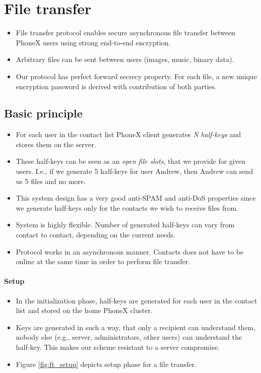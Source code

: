 \documentclass[a4paper,10pt]{article}
\begin{document}
\section{File transfer}
\begin{itemize}
 \item File transfer protocol enables secure asynchronous file transfer between PhoneX users using strong end-to-end encryption.
 \item Arbitrary files can be sent between users (images, music, binary data).
 \item Our protocol has perfect forward secrecy property. For each file, a new unique encryption 
password is derived with contribution of both parties.
\end{itemize}

\subsection{Basic principle}
\begin{itemize}
 \item For each user in the contact list PhoneX client generates \emph{N} \emph{half-keys} and stores them on the server.
 \item These half-keys can be seen as an \emph{open file slots}, that we provide for given users. I.e., 
if we generate 5 half-keys for user Andrew, then Andrew can send us 5 files and no more. %
 \item This system design has a very good anti-SPAM and anti-DoS properties since we generate half-keys only for the contacts we wish to receive files from.
 \item System is highly flexible. Number of generated half-keys can vary from contact to contact, depending on the current needs.
 \item Protocol works in an asynchronous manner. Contacts does not have to be online at the same time in order to perform file transfer.
\end{itemize}

\paragraph{Setup}
\begin{itemize}
 \item In the initialization phase, half-keys are generated for each user in the contact list and stored on the home PhoneX cluster.
 \item Keys are generated in such a way, that only a recipient can understand them, nobody else (e.g., server, administrators, other users) can understand the half-key. 
This makes our scheme resistant to a server compromise.
 \item Figure \ref{fig:ft_setup} depicts setup phase for a file transfer.
\end{itemize}
\end{document}
